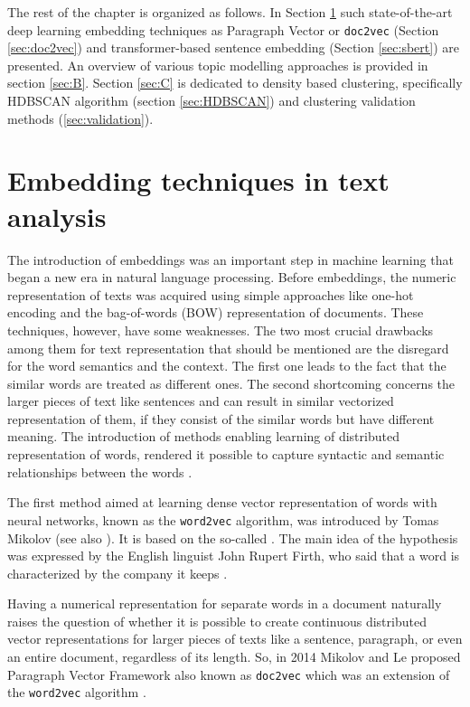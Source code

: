 \documentclass[fontsize=12pt,a4paper,twoside,openany]{scrbook}
\begin{document}
The rest of the chapter is organized as follows. In Section \ref{sec:A} such state-of-the-art deep learning embedding techniques as Paragraph Vector or \verb|doc2vec| (Section \ref{sec:doc2vec}) and transformer-based sentence embedding (Section \ref{sec:sbert}) are presented. An overview of various topic modelling approaches is provided in section \ref{sec:B}. Section \ref{sec:C} is dedicated to density based clustering, specifically HDBSCAN algorithm (section \ref{sec:HDBSCAN}) and clustering validation methods (\ref{sec:validation}).  

\section{Embedding techniques in text analysis}
\label{sec:A}

The introduction of embeddings was an important step in machine learning that began a new era in natural language processing. Before embeddings, the numeric representation of texts was acquired using simple approaches like one-hot encoding and the bag-of-words (BOW) representation of documents. These techniques, however, have some weaknesses. The two most crucial drawbacks among them for text representation that should be mentioned are the disregard for the word semantics and the context. The first one leads to the fact that the similar words are treated as different ones. The second shortcoming concerns the larger pieces of text like sentences and can result in similar vectorized representation of them, if they consist of the similar words but have different meaning. The introduction of methods enabling learning of distributed representation of words, rendered it possible to capture syntactic and semantic relationships between the words \parencite{Le14}. 

The first method aimed at learning dense vector representation of words with neural networks, known as the \verb|word2vec| algorithm, was introduced by Tomas Mikolov \parencite{TMikolov13} (see also \parencite{Mikolov13}). It is based on the so-called  \parencite{Harris54}. The main idea of the hypothesis was expressed by the English linguist John Rupert Firth, who said that a word is characterized by the company it keeps \parencite{Firth57}.

Having a numerical representation for separate words in a document naturally raises the question of whether it is possible to create continuous distributed vector representations for larger pieces of texts like a sentence, paragraph, or even an entire document, regardless of its length. So, in 2014 Mikolov and Le proposed Paragraph Vector Framework also known as \verb|doc2vec| which was an extension of the \verb|word2vec| algorithm \parencite[see][]{Le14}.
\end{document}
